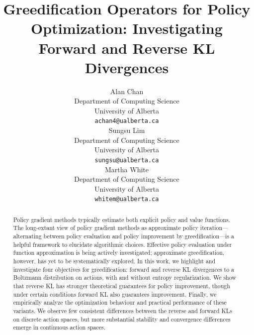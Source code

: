 \documentclass{article}
\title{Greedification Operators for Policy Optimization: Investigating Forward and Reverse KL Divergences}
\author{%
  Alan Chan \\
  Department of Computing Science\\
  University of Alberta\\
  \texttt{achan4@ualberta.ca} \\
   \And
   Sungsu Lim \\
   Department of Computing Science \\
   University of Alberta \\
   \texttt{sungsu@ualberta.ca} \\
   \AND
   Martha White\\
   Department of Computing Science \\
   University of Alberta \\
   \texttt{whitem@ualberta.ca} \\
}
\begin{document}
\maketitle

\begin{abstract}
Policy gradient methods typically estimate both explicit policy and value functions. The long-extant view of policy gradient methods as approximate policy iteration---alternating between policy evaluation and policy improvement by greedification---is a helpful framework to elucidate algorithmic choices. Effective policy evaluation under function approximation is being actively investigated; approximate greedification, however, has yet to be systematically explored. In this work, we highlight and investigate four objectives for greedification: forward and reverse KL divergences to a Boltzmann distribution on actions, with and without entropy regularization. We show that reverse KL has stronger theoretical guarantees for policy improvement, though under certain conditions forward KL also guarantees improvement. Finally, we empirically analyze the optimization behaviour and practical performance of these variants. We observe few consistent differences between the reverse and forward KLs on discrete action spaces, but more substantial stability and convergence differences emerge in continuous action spaces. 
\end{abstract}
\end{document}
